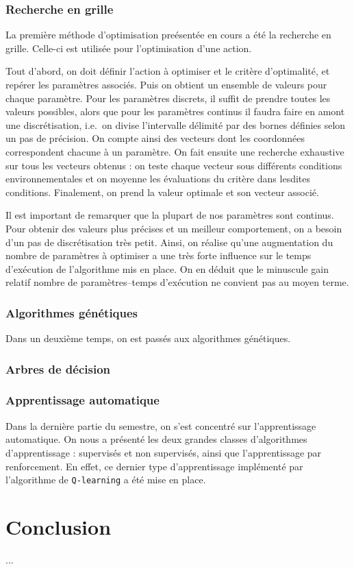 \documentclass[12pt,a4paper]{article}
\begin{document}
\section{Recherche en grille}
La premi\`ere m\'ethode d'optimisation pre\'esent\'ee en cours a \'et\'e la 
recherche en grille. Celle-ci est utilis\'ee pour l'optimisation d'une 
action.

Tout d'abord, on doit d\'efinir l'action \`a optimiser et le crit\`ere 
d'optimalit\'e, et rep\'erer les param\`etres associ\'es. Puis on 
obtient un ensemble de valeurs pour chaque param\`etre. 
Pour les param\`etres discrets, il suffit de prendre toutes les valeurs 
possibles, alors que pour les param\`etres continus il faudra faire en amont 
une discr\'etisation, i.e.\ on divise l'intervalle d\'elimit\'e par des bornes 
d\'efinies selon un pas de pr\'ecision. On compte ainsi des vecteurs dont les 
coordonn\'ees correspondent chacune \`a un param\`etre. On fait ensuite une 
recherche exhaustive sur tous les vecteurs obtenus : on teste chaque vecteur 
sous diff\'erents conditions environnementales et on moyenne les \'evaluations 
 du crit\`ere dans lesdites conditions. Finalement, on prend la valeur optimale 
et son vecteur associ\'e.

Il est important de remarquer que la plupart de nos param\`etres sont continus. 
Pour obtenir des valeurs plus pr\'ecises et un meilleur comportement, on a 
besoin d'un pas de discr\'etisation tr\`es petit. Ainsi, on r\'ealise qu'une 
augmentation du nombre de param\`etres \`a optimiser a une tr\`es forte 
influence sur le temps d'ex\'ecution de l'algorithme mis en place. On en 
d\'eduit que le minuscule gain relatif nombre de param\`etres--temps 
d'ex\'ecution ne convient pas au moyen terme.

\section{Algorithmes g\'en\'etiques}
Dans un deuxi\`eme temps, on est pass\'es aux algorithmes g\'en\'etiques.

\section{Arbres de d\'ecision}

\section{Apprentissage automatique}
Dans la derni\`ere partie du semestre, on s'est concentr\'e sur l'apprentissage 
automatique. On nous a pr\'esent\'e les deux grandes classes 
d'algorithmes d'apprentissage : supervis\'es et non supervis\'es, ainsi que 
l'apprentissage par renforcement. En effet, ce dernier type d'apprentissage 
impl\'ement\'e par l'algorithme de \texttt{Q-learning} a \'et\'e mise en place.

\newpage

\part*{Conclusion}
...
\end{document}
